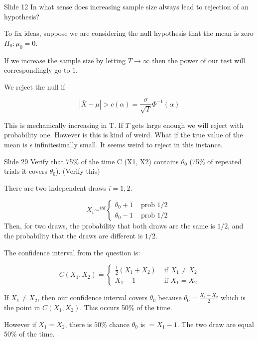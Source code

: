 \documentclass{article}
\begin{document}
\begin{problem}{Slide 12}
In what sense does increasing sample size always lead to rejection of an hypothesis?
\end{problem}

To fix ideas, suppose we are considering the null hypothesis that the mean is zero $H_0: \mu_0 = 0$.

If we increase the sample size by letting $T\rightarrow \infty$ then the power of our test will correspondingly go to $1$.

We reject the null if 

$$
|\bar{X}-\mu|>c(\alpha)=\frac{\sigma}{\sqrt{T}} \Phi^{-1}(\alpha)
$$

This is mechanically increasing in T. If $T$ gets large enough we will reject with probability one. However is this is kind of weird. What if the true value of the mean is $\epsilon$ infinitesimally small. It seems weird to reject in this instance. 
 

\begin{problem}{Slide 29}
Verify that 75\% of the time C (X1, X2) contains $\theta_0$ (75\% of repeated trials it covers $\theta_0$). (Verify this)
\end{problem}

There are two independent draws $i=1,2$.

$$
X_{i} \sim^{iid} \begin{cases}\theta_{0}+1 & \text { prob 1/2 } \\ \theta_{0}-1 & \text { prob } 1 / 2\end{cases}
$$
Then, for two draws, the probability that both draws are the same is $1 / 2$, and the probability that the draws are different is $1 / 2$. 

The confidence interval from the question is:
 
$$
C\left(X_{1}, X_{2}\right)= \begin{cases}\frac{1}{2}\left(X_{1}+X_{2}\right) & \text { if } X_{1} \neq X_{2} \\ X_{1}-1 & \text { if } X_{1}=X_{2}\end{cases}
$$

If $X_{1} \neq X_{2}$, then our confidence interval covers $\theta_0$ because $\theta_{0}=\frac{X_{1}+X_{2}}{2}$ which is the point in $C(X_1,X_2)$. This occurs 50\% of the time.

However if $X_{1}=X_{2}$, there is $50 \%$ chance $\theta_{0}$ is $=X_{1}-1$. The two draw are equal 50\% of the time.
\end{document}
